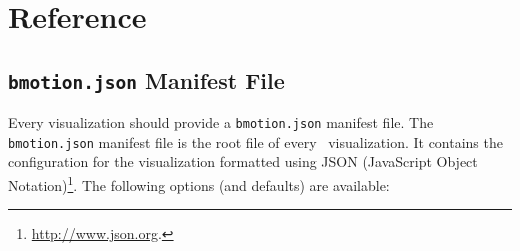 \section{Reference}
\label{reference}

\subsection{\texttt{bmotion.json} Manifest File}
\label{sec:manifest}

Every visualization should provide a \texttt{bmotion.json} manifest file.
The \texttt{bmotion.json} manifest file is the root file of every \bms\ visualization.
It contains the configuration for the visualization formatted using JSON (JavaScript Object Notation)\footnote{\url{http://www.json.org}.}.
The following options (and defaults) are available:

